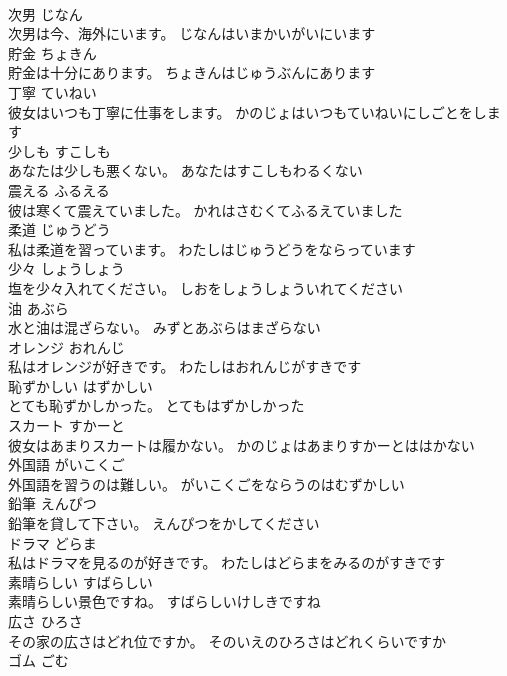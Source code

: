 \documentclass[8pt]{extreport}
\begin{document}
\begin{CJK}{UTF8}{min}
\\	次男	じなん	
\\	次男は今、海外にいます。	じなんはいまかいがいにいます	
\\	貯金	ちょきん	
\\	貯金は十分にあります。	ちょきんはじゅうぶんにあります	
\\	丁寧	ていねい	
\\	彼女はいつも丁寧に仕事をします。	かのじょはいつもていねいにしごとをします	
\\	少しも	すこしも	
\\	あなたは少しも悪くない。	あなたはすこしもわるくない	
\\	震える	ふるえる	
\\	彼は寒くて震えていました。	かれはさむくてふるえていました	
\\	柔道	じゅうどう	
\\	私は柔道を習っています。	わたしはじゅうどうをならっています	
\\	少々	しょうしょう	
\\	塩を少々入れてください。	しおをしょうしょういれてください	
\\	油	あぶら	
\\	水と油は混ざらない。	みずとあぶらはまざらない	
\\	オレンジ	おれんじ	
\\	私はオレンジが好きです。	わたしはおれんじがすきです	
\\	恥ずかしい	はずかしい	
\\	とても恥ずかしかった。	とてもはずかしかった	
\\	スカート	すかーと	
\\	彼女はあまりスカートは履かない。	かのじょはあまりすかーとははかない	
\\	外国語	がいこくご	
\\	外国語を習うのは難しい。	がいこくごをならうのはむずかしい	
\\	鉛筆	えんぴつ	
\\	鉛筆を貸して下さい。	えんぴつをかしてください	
\\	ドラマ	どらま	
\\	私はドラマを見るのが好きです。	わたしはどらまをみるのがすきです	
\\	素晴らしい	すばらしい	
\\	素晴らしい景色ですね。	すばらしいけしきですね	
\\	広さ	ひろさ	
\\	その家の広さはどれ位ですか。	そのいえのひろさはどれくらいですか	
\\	ゴム	ごむ	

\end{CJK}
\end{document}
